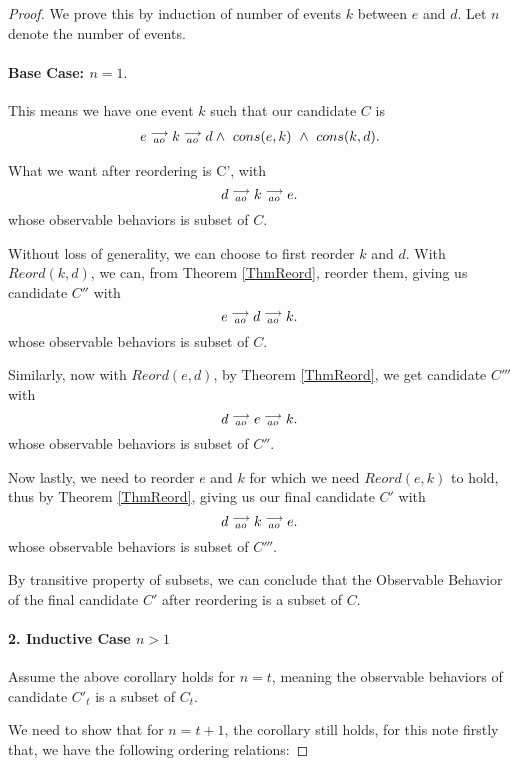 \begin{proof}
    We prove this by induction of number of events $k$ between $e$ and $d$. Let $n$ denote the number of events.

    \paragraph{Base Case: $n = 1.$}
        This means we have one event $k$ such that our candidate $C$ is
        \begin{align*}
            \reln{e}{ao}{\reln{k}{ao}{d}} \wedge \ cons(e,k) \ \wedge \ cons(k,d).
        \end{align*}
                
        What we want after reordering is C', with
        \[
            d\stackrel{\longrightarrow}{_{ao}}k\stackrel{\longrightarrow}{_{ao}}e. 
        \]
        whose observable behaviors is subset of $C$.

        Without loss of generality, we can choose to first reorder $k$ and $d$. With $Reord(k,d)$, we can, from Theorem \ref{ThmReord}, reorder them, giving us candidate $C''$ with
        \[
            e\stackrel{\longrightarrow}{_{ao}}d\stackrel{\longrightarrow}{_{ao}}k. 
        \]
        whose observable behaviors is subset of $C$.

        Similarly, now with $Reord(e,d)$, by Theorem \ref{ThmReord}, we get candidate $C'''$ with 
        \[
            d\stackrel{\longrightarrow}{_{ao}}e\stackrel{\longrightarrow}{_{ao}}k. 
        \]
        whose observable behaviors is subset of $C''$.

        Now lastly, we need to reorder $e$ and $k$ for which we need $Reord(e,k)$ to hold, thus by Theorem \ref{ThmReord}, giving us our final candidate $C'$ with
        \[
            d\stackrel{\longrightarrow}{_{ao}}k\stackrel{\longrightarrow}{_{ao}}e.
        \]
        whose observable behaviors is subset of $C'''$.

        By transitive property of subsets, we can conclude that the Observable Behavior of the final candidate $C'$ after reordering is a subset of $C$.  

    \paragraph{2. Inductive Case $n > 1$}
        Assume the above corollary holds for $n = t$, meaning the observable behaviors of candidate $C'_t$ is a subset of $C_t$. 
        
        We need to show that for $n = t + 1$, the corollary still holds, for this note firstly that, we have the following ordering relations:
        

\end{proof}
